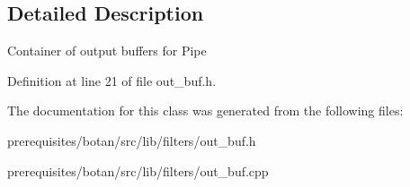 \subsection{Detailed Description}
Container of output buffers for Pipe 

Definition at line 21 of file out\+\_\+buf.\+h.



The documentation for this class was generated from the following files\+:\begin{DoxyCompactItemize}
\item 
prerequisites/botan/src/lib/filters/out\+\_\+buf.\+h\item 
prerequisites/botan/src/lib/filters/out\+\_\+buf.\+cpp\end{DoxyCompactItemize}

